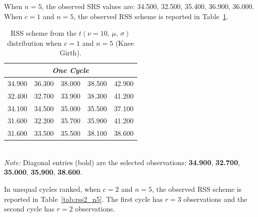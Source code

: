 \documentclass[12pt, a4paper]{article}
\begin{document}

When $n = 5$, the observed SRS values are:
34.500, 32.500, 35.400, 36.900, 36.000.
When $c = 1$ and $n = 5$, the observed RSS scheme is reported in
Table~\ref{tab:rss_n5}.

\begin{table}[H]
  \centering
  \caption{RSS scheme from the $t(\nu=10,\,\mu,\,\sigma)$ distribution
           when $c = 1$ and $n = 5$ (Knee Girth).}
  \label{tab:rss_n5}
  \begin{tabular}{ccccc}
    \toprule
    \multicolumn{5}{c}{\textit{One Cycle}} \\
    \midrule
    34.900 & 36.300 & 38.000 & 38.500 & 42.900 \\
    32.400 & 32.700 & 33.900 & 38.300 & 41.200 \\
    34.100 & 34.500 & 35.000 & 35.500 & 37.100 \\
    31.600 & 32.200 & 35.700 & 35.900 & 41.200 \\
    31.600 & 33.500 & 35.500 & 38.100 & 38.600 \\
    \bottomrule
  \end{tabular}
  \smallskip\\
  \footnotesize
  \textit{Note:} Diagonal entries (bold) are the selected observations:
  \textbf{34.900}, \textbf{32.700}, \textbf{35.000}, \textbf{35.900},
  \textbf{38.600}.
\end{table}

In unequal cycles ranked, when $c = 2$ and $n = 5$, the observed RSS
scheme is reported in Table~\ref{tab:rss2_n5}. The first cycle has
$r = 3$ observations and the second cycle has $r = 2$ observations.
\end{document}
